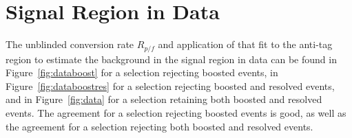 \section{Signal Region in Data\label{ss:BkgInSigRegion}}

 

The unblinded conversion rate $R_{p/f}$ and application of that fit to the anti-tag region to estimate the background in the signal region in data can be found in Figure~\ref{fig:databoost} for a selection rejecting boosted events, in Figure~\ref{fig:databoostres} for a selection rejecting boosted and resolved events, and in Figure~\ref{fig:data} for a selection retaining both boosted and resolved events. The agreement for a selection rejecting boosted events is good, as well as the agreement for a selection rejecting both boosted and resolved events.

